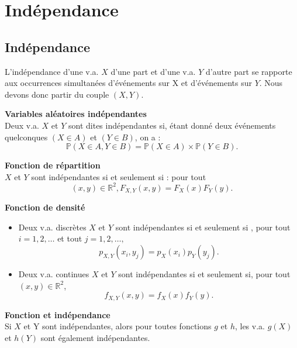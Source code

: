 \documentclass[../PolyS4.tex]{subfiles}
\begin{document}
\newpage 

\section{Ind\' ependance}



\subsection{Indépendance}

L'indépendance d'une v.a. $X$ d'une part et d'une v.a. $Y$ d'autre part se rapporte aux occurrences simultanées d'événements sur X et d'événements sur $Y$. Nous devons donc partir du couple $(X, Y )$.\\


\begin{Def} {\textbf{Variables aléatoires indépendantes}}\\
 Deux v.a. $X$ et $Y$ sont dites indépendantes si, étant donné
deux événements quelconques $(X \in A)$ et $(Y \in B)$, on a :
$$\mathbb P(X \in A, Y \in B) = \mathbb P(X \in A) \times \mathbb P(Y \in B).$$
\end{Def}



\begin{Prop} 
 {\textbf{Fonction de répartition}}\\
 $X$ et $Y$ sont indépendantes si et seulement si :
pour tout $$(x, y) \in \mathbb{R}^2, F_{X,Y} (x, y) = F_X(x) F_Y (y).$$
\end{Prop}




\begin{Prop}  {\textbf{Fonction de densité}}\\
\begin{itemize}
\item
 Deux v.a. discrètes $X$ et $Y$ sont indépendantes si et seulement
si , pour tout $i = 1, 2, \dots$ et tout $j = 1, 2, \dots ,$
$$p_{X,Y} (x_i, y_j) = p_X(x_i) p_Y (y_j) .$$
\item Deux v.a. continues $X$ et $Y$ sont indépendantes si et seulement
si, pour tout $(x, y) \in \mathbb R^2$,
$$f_{X,Y} (x, y) = f_X(x) f_Y (y) .$$
\end{itemize}
\end{Prop}

\begin{Prop}  {\textbf{Fonction et indépendance}}\\
 Si $X$ et Y sont indépendantes, alors pour toutes fonctions $g$ et $h$, les v.a. $g(X)$ et $h(Y )$ sont également indépendantes.\\

\end{Prop}
\end{document}
